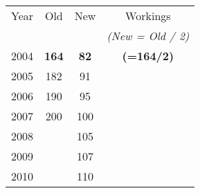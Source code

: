 \begin{center}
\begin{tabular}
{|c||c|c||c|}
\hline
Year	&\phantom{sp}	Old	\phantom{sp}&\phantom{sp}	New\phantom{sp}	&	Workings	\\ 
	&&	&	\textit{(New = Old / 2)}	\\ 
\hline \hline



2004	&	\textbf{164}	&	\textbf{82}	&	\textbf{(=164/2)}	\\ \hline
2005	&	182	&	91	&		\\ \hline
2006	&	190	&	95	&		\\ \hline
2007	&	200	&	100	&		\\ \hline
2008	&		&	105	&		\\ \hline
2009	&		&	107	&		\\ \hline
2010	&		&	110	&		\\ \hline
\end{tabular}  
\end{center}

